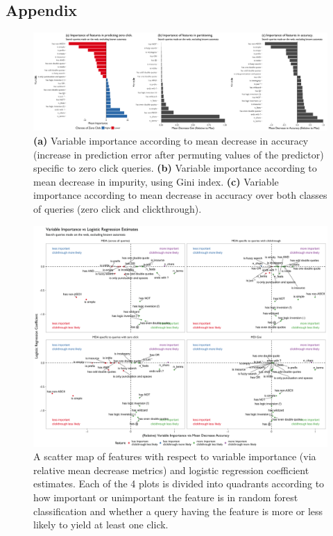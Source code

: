 \documentclass[12pt,]{article}
\begin{document}
\begin{landscape}

\subsection{Appendix}

\begin{figure}[h!]
\centering
\includegraphics{figures/var_imp_ctr.png}
\caption{\textbf{(a)} Variable importance according to mean decrease in accuracy (increase in prediction error after permuting values of the predictor) specific to zero click queries. \textbf{(b)} Variable importance according to mean decrease in impurity, using Gini index. \textbf{(c)} Variable importance according to mean decrease in accuracy over both classes of queries (zero click and clickthrough).}
\label{fig:mda_coef}
\end{figure}

\begin{figure}[h!]
\centering
\includegraphics{figures/mda_logitcoef_ctr.png}
\caption{A scatter map of features with respect to variable importance (via relative mean decrease metrics) and logistic regression coefficient estimates. Each of the 4 plots is divided into quadrants according to how important or unimportant the feature is in random forest classification and whether a query having the feature is more or less likely to yield at least one click.}
\label{fig:mda_coef}
\end{figure}

\end{landscape}
\end{document}
